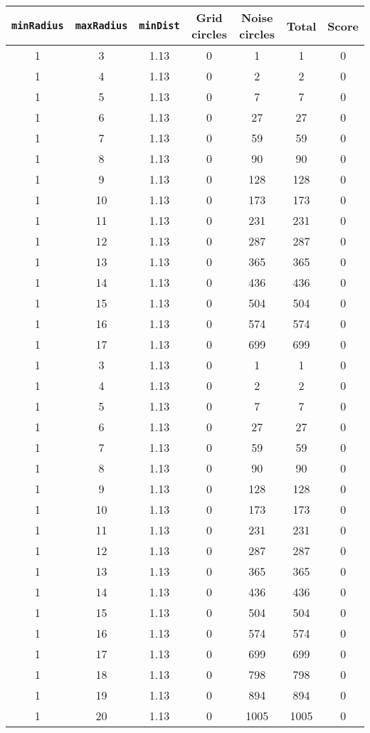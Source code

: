 \documentclass[letterpaper, 12pt]{article}
\begin{document}
\begin{longtable}{|c|c|c|c|c|c|c|}
\hline
\textbf{\texttt{minRadius}} & \textbf{\texttt{maxRadius}} & \textbf{\texttt{minDist}} & \textbf{Grid circles} & \textbf{Noise circles} & \textbf{Total} & \textbf{Score} \\
\hline
1 & 3 & 1.13 & 0 & 1 & 1 & 0 \\
\hline
1 & 4 & 1.13 & 0 & 2 & 2 & 0 \\
\hline
1 & 5 & 1.13 & 0 & 7 & 7 & 0 \\
\hline
1 & 6 & 1.13 & 0 & 27 & 27 & 0 \\
\hline
1 & 7 & 1.13 & 0 & 59 & 59 & 0 \\
\hline
1 & 8 & 1.13 & 0 & 90 & 90 & 0 \\
\hline
1 & 9 & 1.13 & 0 & 128 & 128 & 0 \\
\hline
1 & 10 & 1.13 & 0 & 173 & 173 & 0 \\
\hline
1 & 11 & 1.13 & 0 & 231 & 231 & 0 \\
\hline
1 & 12 & 1.13 & 0 & 287 & 287 & 0 \\
\hline
1 & 13 & 1.13 & 0 & 365 & 365 & 0 \\
\hline
1 & 14 & 1.13 & 0 & 436 & 436 & 0 \\
\hline
1 & 15 & 1.13 & 0 & 504 & 504 & 0 \\
\hline
1 & 16 & 1.13 & 0 & 574 & 574 & 0 \\
\hline
1 & 17 & 1.13 & 0 & 699 & 699 & 0 \\
\hline
1 & 3 & 1.13 & 0 & 1 & 1 & 0 \\
\hline
1 & 4 & 1.13 & 0 & 2 & 2 & 0 \\
\hline
1 & 5 & 1.13 & 0 & 7 & 7 & 0 \\
\hline
1 & 6 & 1.13 & 0 & 27 & 27 & 0 \\
\hline
1 & 7 & 1.13 & 0 & 59 & 59 & 0 \\
\hline
1 & 8 & 1.13 & 0 & 90 & 90 & 0 \\
\hline
1 & 9 & 1.13 & 0 & 128 & 128 & 0 \\
\hline
1 & 10 & 1.13 & 0 & 173 & 173 & 0 \\
\hline
1 & 11 & 1.13 & 0 & 231 & 231 & 0 \\
\hline
1 & 12 & 1.13 & 0 & 287 & 287 & 0 \\
\hline
1 & 13 & 1.13 & 0 & 365 & 365 & 0 \\
\hline
1 & 14 & 1.13 & 0 & 436 & 436 & 0 \\
\hline
1 & 15 & 1.13 & 0 & 504 & 504 & 0 \\
\hline
1 & 16 & 1.13 & 0 & 574 & 574 & 0 \\
\hline
1 & 17 & 1.13 & 0 & 699 & 699 & 0 \\
\hline
1 & 18 & 1.13 & 0 & 798 & 798 & 0 \\
\hline
1 & 19 & 1.13 & 0 & 894 & 894 & 0 \\
\hline
1 & 20 & 1.13 & 0 & 1005 & 1005 & 0 \\
\hline
\end{longtable}
\end{document}
